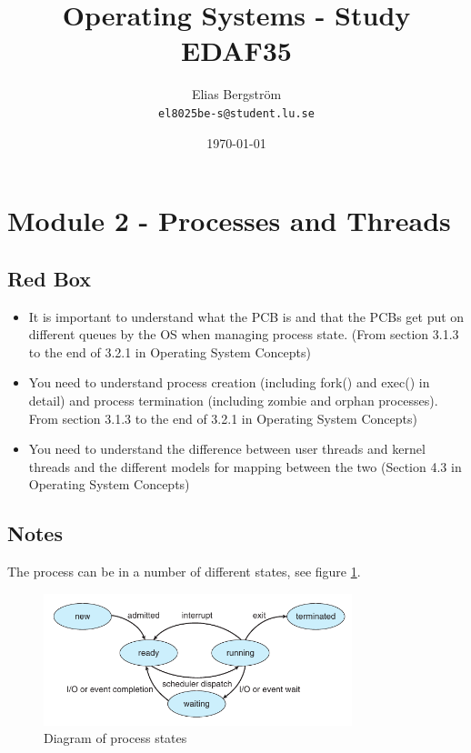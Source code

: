 \documentclass{article}
\title{\Huge Operating Systems - Study \\ EDAF35}
\author{  
    Elias Bergström\\
    \texttt{el8025be-s@student.lu.se}
    }
\date{\today}
\begin{document}
\maketitle
\thispagestyle{empty}
\pagebreak

\section{Module 2 - Processes and Threads}
\subsection{Red Box}
\begin{itemize}
    \item It is important to understand what the PCB is and that the PCBs get put on different queues by the OS when
    managing process state.
    (From section 3.1.3 to the end of 3.2.1 in Operating System Concepts)
    \item You need to understand process creation (including fork() and exec() in detail) and process termination (including
    zombie and orphan processes). From section 3.1.3 to the end of 3.2.1 in Operating System Concepts)
    \item You need to understand the difference between user threads and kernel threads and the different models for
    mapping between the two (Section 4.3 in Operating System Concepts)
\end{itemize}

\subsection{Notes}



The process can be in a number of different states, see figure \ref{fig:diapcb}.

\begin{figure}[H]
    \centering
    \includegraphics[width=0.8\textwidth]{pcb.png}
    \caption{Diagram of process states}
    \label{fig:diapcb}
\end{figure}
\end{document}
